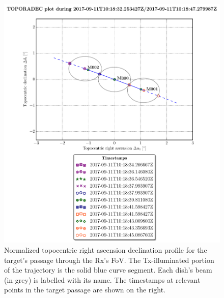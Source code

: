 \documentclass[conference]{IEEEtran}
\begin{document}
\begin{figure}[ht]
	\centering
	\includegraphics[scale=0.4]{main057iss100radecnormalized0test.pdf}
	\caption[Topocentric right ascension declination profile for the target's passage]{Normalized topocentric right ascension declination profile for the target's passage through the Rx's FoV. The Tx-illuminated portion of the trajectory is the solid blue curve segment. Each dish's beam (in grey) is labelled with its name. The timestamps at relevant points in the target passage are shown on the right.  }\label{fig:schedu:schedu:rx:10:radecnormalized}
\end{figure}
\end{document}
